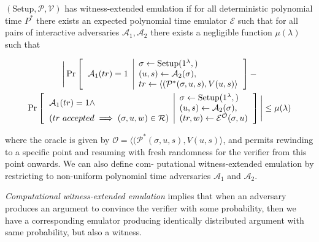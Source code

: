 \begin{defn}
    $(\text{Setup}, \mathcal{P}, \mathcal{V})$ has witness-extended
    emulation if for all deterministic polynomial time $P^{*}$ there exists an expected polynomial time
    emulator $\mathcal{E}$ such that for all pairs of interactive adversaries $\mathcal{A}_1 , \mathcal{A}_2$ there exists a negligible function
    $\mu (\lambda)$ such that
    
    \begin{multline*}
    \Bigg|
        \Pr
        \left[
        \begin{tabular}{c | l}
             \multirow{3}{*}{$\mathcal{A}_1(tr) = 1$}
             & $\sigma \leftarrow \text{Setup}(1^{\lambda},)$
             \\
             & 
             $(u, s) \leftarrow \mathcal{A}_2(\sigma),$
             \\
             & $tr \leftarrow \langle (\mathcal{P}^{*}(\sigma, u, s), V(u, s) \rangle$
        \end{tabular}
        \right]
        -\\
        \Pr 
        \left[
            \begin{tabular}{l | l}
                \multirow{2}{*}{$\mathcal{A}_1(tr) = 1 \wedge$}
                &
                $\sigma \leftarrow \text{Setup}(1^{\lambda},)$
                \\
                & 
                $(u, s) \leftarrow \mathcal{A}_2(\sigma),$
                \\
                $(tr\ accepted \implies (\sigma, u, w)\in \mathcal{R})$
                &
                $(tr, w) \leftarrow \mathcal{E}^{\mathcal{O}}(\sigma, u)$
           \end{tabular}
           \right]
    \Bigg|
    \leq \mu(\lambda)
    \end{multline*}
    
    where the oracle is given by  $\mathcal{O} = \langle (\mathcal{P}^{*}(\sigma, u, s), V(u, s) \rangle$, and permits rewinding to a specific point and
    resuming with fresh randomness for the verifier from this point onwards. We can also define com-
    putational witness-extended emulation by restricting to non-uniform polynomial time adversaries
    $\mathcal{A}_1$ and $\mathcal{A}_2$.       
    
\end{defn}

\textit{Computational witness-extended emulation} implies that when an adversary produces an argument to convince the verifier with some probability, then we have a corresponding emulator producing identically distributed argument with same probability, but also a witness.

